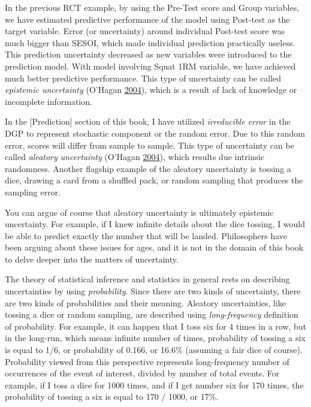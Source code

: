\documentclass[
]{book}
\begin{document}
In the previous RCT example, by using the Pre-Test score and Group variables, we have estimated predictive performance of the model using Post-test as the target variable. Error (or uncertainty) around individual Post-test score was much bigger than SESOI, which made individual prediction practically useless. This prediction uncertainty decreased as new variables were introduced to the prediction model. With model involving Squat 1RM variable, we have achieved much better predictive performance. This type of uncertainty can be called \emph{epistemic uncertainty} (O'Hagan \protect\hyperlink{ref-ohaganDicingUnknown2004}{2004}), which is a result of lack of knowledge or incomplete information.

In the {[}Prediction{]} section of this book, I have utilized \emph{irreducible error} in the DGP to represent stochastic component or the random error. Due to this random error, scores will differ from sample to sample. This type of uncertainty can be called \emph{aleatory uncertainty} (O'Hagan \protect\hyperlink{ref-ohaganDicingUnknown2004}{2004}), which results due intrinsic randomness. Another flagship example of the aleatory uncertainty is tossing a dice, drawing a card from a shuffled pack, or random sampling that produces the sampling error.

You can argue of course that aleatory uncertainty is ultimately epistemic uncertainty. For example, if I knew infinite details about the dice tossing, I would be able to predict exactly the number that will be landed. Philosophers have been arguing about these issues for ages, and it is not in the domain of this book to delve deeper into the matters of uncertainty.

The theory of statistical inference and statistics in general rests on describing uncertainties by using \emph{probability}. Since there are two kinds of uncertainty, there are two kinds of probabilities and their meaning. Aleatory uncertainties, like tossing a dice or random sampling, are described using \emph{long-frequency} definition of probability. For example, it can happen that I toss six for 4 times in a row, but in the long-run, which means infinite number of times, probability of tossing a six is equal to 1/6, or probability of 0.166, or 16.6\% (assuming a fair dice of course). Probability viewed from this perspective represents long-frequency number of occurrences of the event of interest, divided by number of total events. For example, if I toss a dice for 1000 times, and if I get number six for 170 times, the probability of tossing a six is equal to 170 / 1000, or 17\%.
\end{document}
